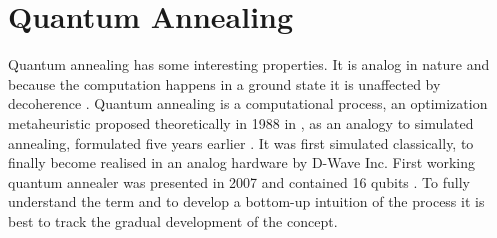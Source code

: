 \section{Quantum Annealing}
Quantum annealing has some interesting properties. It is analog in nature and because the computation happens in a ground state it is unaffected by decoherence \cite{mcgeoch2014adiabatic}.
Quantum annealing is a computational process, an optimization metaheuristic proposed theoretically in 1988 in \cite{apolloni1988numerical}, as an analogy to simulated annealing, formulated five years earlier \cite{kirkpatrick1983optimization}. It was first simulated classically, to finally become realised in an analog hardware by D-Wave Inc. First working quantum annealer was presented in 2007 and contained 16 qubits \cite{d-wave_inc_d-wave_2007}. To fully understand the term and to develop a bottom-up intuition of the process it is best to track the gradual development of the concept.


